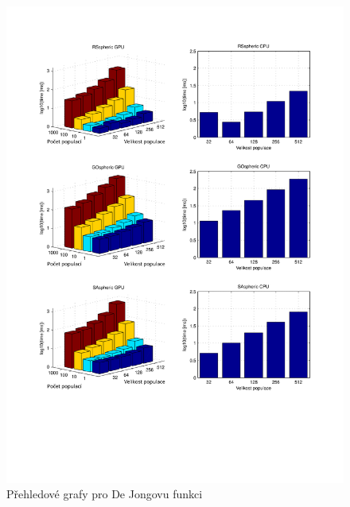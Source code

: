 \begin{figure}[h!]
\begin{center}
  \includegraphics[width=\textwidth]{img/graphsSP}
  \caption{Přehledové grafy pro De Jongovu funkci}\label{SP graphs}
  \end{center}
\end{figure}
\clearpage

